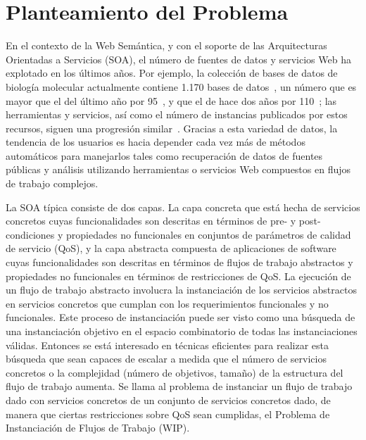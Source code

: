 \section{Planteamiento del Problema}

En el contexto de la Web Semántica, y con el soporte de las Arquitecturas Orientadas a
Servicios (SOA), el número de fuentes de datos y servicios Web ha explotado en
los últimos años. Por ejemplo, la colección de bases de datos de biología
molecular actualmente contiene 1.170 bases de datos~\cite{Galperin09}, un número
que es
mayor que el del último año por 95~\cite{Galperin2008}, y que el de hace dos
años por 110~\cite{Galperin2007};
las herramientas y servicios, así como el número de instancias
publicados por estos recursos, siguen una progresión similar~\cite{Benson07}.
Gracias a
esta variedad de datos, la tendencia de los usuarios es hacia depender cada vez
más de métodos automáticos para manejarlos tales como recuperación de datos de
fuentes públicas y análisis utilizando herramientas o servicios Web compuestos
en flujos de trabajo complejos.

La SOA típica consiste de dos capas. La capa concreta que está hecha de
servicios concretos cuyas funcionalidades son descritas en términos de pre- y
post-condiciones y propiedades no funcionales en conjuntos de parámetros de
calidad de servicio (QoS), y
la capa abstracta compuesta de aplicaciones de software cuyas funcionalidades
son descritas en términos de flujos de trabajo abstractos y propiedades no
funcionales en términos de restricciones de QoS. La ejecución de un flujo de
trabajo abstracto involucra la instanciación de los servicios abstractos en
servicios concretos que cumplan con los requerimientos funcionales y no
funcionales. Este proceso de instanciación puede ser visto como una búsqueda de
una instanciación objetivo en el espacio combinatorio de todas las
instanciaciones válidas. Entonces se está interesado en técnicas eficientes para
realizar esta búsqueda que sean capaces de escalar a medida que el número de
servicios concretos o la complejidad (número
de objetivos, tamaño) de la estructura del flujo de trabajo  aumenta. Se llama al
problema de instanciar un flujo de trabajo dado con servicios concretos de un
conjunto de servicios concretos dado, de manera que ciertas restricciones sobre QoS sean
cumplidas, el Problema de Instanciación de Flujos de Trabajo (WIP).


